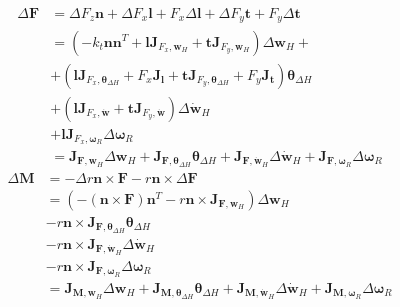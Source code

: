 \begin{equation}
    \begin{split}
        \Delta \mathbf{F} &= \Delta F_z \mathbf{n} + \Delta F_x \mathbf{l} + F_x \Delta \mathbf{l} + \Delta F_y \mathbf{t} + F_y \Delta \mathbf{t}\\
        &= \left(-k_t \mathbf{n}\mathbf{n}^T + \mathbf{l} \mathbf{J}_{F_x, \mathbf{w}_H} + \mathbf{t} \mathbf{J}_{F_y, \mathbf{w}_H}\right) \Delta \mathbf{w}_H + \\
        &+ \left(\mathbf{l} \mathbf{J}_{F_x, \boldsymbol{\theta}_{\Delta H}} + F_x \mathbf{J}_\mathbf{l} + \mathbf{t}\mathbf{J}_{F_y, \boldsymbol{\theta}_{\Delta H}} + F_y \mathbf{J}_\mathbf{t}\right) \boldsymbol{\theta}_{\Delta H} \\
        & + \left(\mathbf{l} \mathbf{J}_{F_x, \dot{\mathbf{w}}} + \mathbf{t} \mathbf{J}_{F_y, \dot{\mathbf{w}}} \right) \Delta {\dot{\mathbf{w}}}_H\\
        & + \mathbf{l} \mathbf{J}_{F_x, \boldsymbol{\omega}_R} \Delta \boldsymbol{\omega}_R\\
        &= \mathbf{J}_{\mathbf{F}, \mathbf{w}_H} \Delta \mathbf{w}_H + \mathbf{J}_{\mathbf{F}, \boldsymbol{\theta}_{\Delta H}} \boldsymbol{\theta}_{\Delta H} + \mathbf{J}_{\mathbf{F}, \dot{\mathbf{w}}_H} \Delta {\dot{\mathbf{w}}}_H + \mathbf{J}_{\mathbf{F}, \boldsymbol{\omega}_R} \Delta \boldsymbol{\omega}_R
    \end{split}
\end{equation}
\begin{equation}
    \begin{split}
        \Delta \mathbf{M} &= -\Delta r \mathbf{n} \times \mathbf{F} - r\mathbf{n} \times \Delta \mathbf{F}\\
        &= \left(- \left(\mathbf{n} \times \mathbf{F}\right) \mathbf{n}^T - r\mathbf{n} \times \mathbf{J}_{\mathbf{F}, \mathbf{w}_H}\right) \Delta \mathbf{w}_H \\
        & - r\mathbf{n} \times \mathbf{J}_{\mathbf{F}, \boldsymbol{\theta}_{\Delta H}} \boldsymbol{\theta}_{\Delta H}\\
        & - r\mathbf{n} \times \mathbf{J}_{\mathbf{F}, \dot{\mathbf{w}}_H} \Delta {\dot{\mathbf{w}}}_H \\
        & - r\mathbf{n} \times \mathbf{J}_{\mathbf{F}, \boldsymbol{\omega}_R} \Delta \boldsymbol{\omega}_R\\
        &= \mathbf{J}_{\mathbf{M}, \mathbf{w}_H} \Delta \mathbf{w}_H + \mathbf{J}_{\mathbf{M}, \boldsymbol{\theta}_{\Delta H}} \boldsymbol{\theta}_{\Delta H} + \mathbf{J}_{\mathbf{M}, \dot{\mathbf{w}}_H} \Delta {\dot{\mathbf{w}}}_H + \mathbf{J}_{\mathbf{M}, \boldsymbol{\omega}_R} \Delta \boldsymbol{\omega}_R
    \end{split}
\end{equation}

